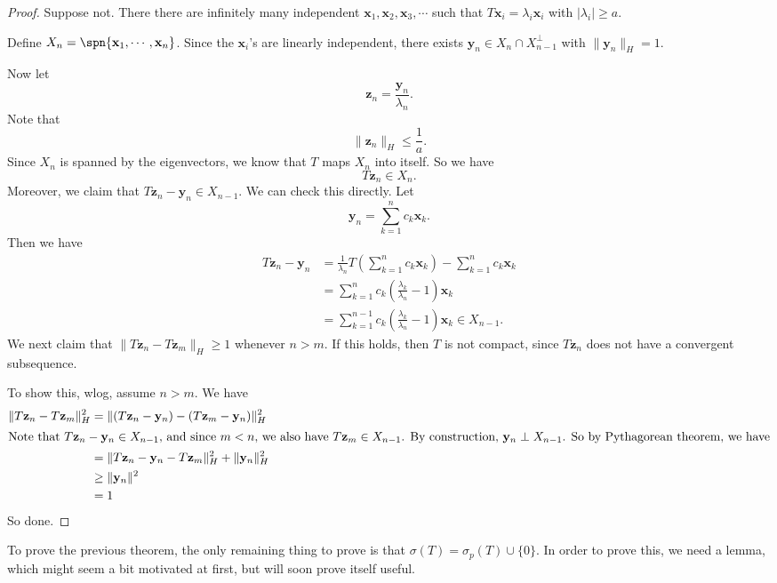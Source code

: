 \documentclass[a4paper]{article}
\begin{document}
\begin{proof}
  Suppose not. There there are infinitely many independent $\mathbf{x}_1, \mathbf{x}_2, \mathbf{x}_3, \cdots$ such that $T \mathbf{x}_i = \lambda_i \mathbf{x}_i$ with $|\lambda_i| \geq a$.

  Define $X_n = \spn\{\mathbf{x}_1, \cdots, \mathbf{x}_n\}$. Since the $\mathbf{x}_i$'s are linearly independent, there exists $\mathbf{y}_n \in X_n \cap X_{n - 1}^\perp$ with $\|\mathbf{y}_n\|_H = 1$.

  Now let
  \[
    \mathbf{z}_n = \frac{\mathbf{y}_n}{\lambda_n}.
  \]
  Note that
  \[
    \|\mathbf{z}_n\|_H \leq \frac{1}{a}.
  \]
  Since $X_n$ is spanned by the eigenvectors, we know that $T$ maps $X_n$ into itself. So we have
  \[
    T \mathbf{z}_n \in X_n.
  \]
  Moreover, we claim that $T \mathbf{z}_n - \mathbf{y}_n \in X_{n - 1}$. We can check this directly. Let
  \[
    \mathbf{y}_n = \sum_{k = 1}^n c_k \mathbf{x}_k.
  \]
  Then we have
  \begin{align*}
    T\mathbf{z}_n - \mathbf{y}_n &= \frac{1}{\lambda_n} T\left(\sum_{k = 1}^n c_k \mathbf{x}_k\right) - \sum_{k = 1}^n c_k \mathbf{x}_k\\
    &= \sum_{k = 1}^n c_k \left(\frac{\lambda_k}{\lambda_n} - 1\right) \mathbf{x}_k\\
    &= \sum_{k = 1}^{n - 1} c_k \left(\frac{\lambda_k}{\lambda_n} - 1\right) \mathbf{x}_k \in X_{n - 1}.
  \end{align*}
  We next claim that $\|T \mathbf{z}_n - T \mathbf{z}_m\|_H \geq 1$ whenever $n > m$. If this holds, then $T$ is not compact, since $T \mathbf{z}_n$ does not have a convergent subsequence.

  To show this, wlog, assume $n > m$. We have
  \begin{align*}
    \|T \mathbf{z}_n - T \mathbf{z}_m\|_H^2 &= \|(T \mathbf{z}_n - \mathbf{y}_n) - (T \mathbf{z}_m - \mathbf{y}_n)\|_H^2\\
    \intertext{Note that $T \mathbf{z}_n - \mathbf{y}_n \in X_{n - 1}$, and since $m < n$, we also have $T \mathbf{z}_m \in X_{n - 1}$. By construction, $\mathbf{y}_n \perp X_{n - 1}$. So by Pythagorean theorem, we have}
    &= \|T \mathbf{z}_n - \mathbf{y}_n - T \mathbf{z}_m\|_H^2 + \|\mathbf{y}_n\|_H^2\\
    &\geq \|\mathbf{y}_n\|^2\\
    &= 1
  \end{align*}
  So done.
\end{proof}

To prove the previous theorem, the only remaining thing to prove is that $\sigma(T) = \sigma_p(T) \cup \{0\}$. In order to prove this, we need a lemma, which might seem a bit motivated at first, but will soon prove itself useful.
\end{document}
